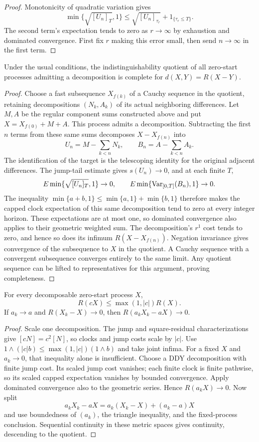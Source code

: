 \begin{proof}
Monotonicity of quadratic variation gives
\[
 \min\{\sqrt{[U_n]_T},1\}
 \leq\sqrt{[U_n]_{\tau_r}}+1_{\{\tau_r\leq T\}}.
\]
The second term's expectation tends to zero as $r\to\infty$ by exhaustion
and dominated convergence. First fix $r$ making this error small, then
send $n\to\infty$ in the first term.
\end{proof}
\begin{theorem}
Under the usual conditions, the indistinguishability quotient of all
zero-start processes admitting a decomposition is complete for
$d(X,Y)=R(X-Y)$.
\end{theorem}
\begin{proof}
Choose a fast subsequence $X_{f(k)}$ of a Cauchy sequence in the quotient,
retaining decompositions $(N_k,A_k)$ of its actual neighboring differences.
Let $M,A$ be the regular component sums constructed above and put
$X=X_{f(0)}+M+A$. This process admits a decomposition.
Subtracting the first $n$ terms from these same sums decomposes
$X-X_{f(n)}$ into
\[
 U_n=M-\sum_{k<n}N_k,\qquad B_n=A-\sum_{k<n}A_k.
\]
The identification of the target is the telescoping identity for the
original adjacent differences. The jump-tail estimate gives $s(U_n)\to0$,
and at each finite $T$,
\[
 E\min\{\sqrt{[U_n]_T},1\}\to0,\qquad
 E\min\{\operatorname{Var}_{[0,T]}(B_n),1\}\to0.
\]
The inequality $\min\{a+b,1\}\leq\min\{a,1\}+\min\{b,1\}$ therefore
makes the capped clock expectation of this same decomposition tend to
zero at every integer horizon. These expectations are at most one, so
dominated convergence also applies to their geometric weighted sum.
The decomposition's $r^1$ cost tends to zero, and hence so does its
infimum $R(X-X_{f(n)})$. Negation invariance gives convergence of the
subsequence to $X$ in the quotient. A Cauchy sequence with a convergent
subsequence converges entirely to the same limit. Any quotient sequence
can be lifted to representatives for this argument, proving completeness.
\end{proof}
\begin{lemma}
For every decomposable zero-start process $X$,
\[R(cX)\leq\max(1,|c|)R(X).\]
If $a_k\to a$ and $R(X_k-X)\to0$, then $R(a_kX_k-aX)\to0$.
\end{lemma}
\begin{proof}
Scale one decomposition. The jump and square-residual characterizations give
$[cN]=c^2[N]$, so clocks and jump costs scale by $|c|$.
Use $1\wedge(|c|b)\leq\max(1,|c|)(1\wedge b)$ and take joint infima.
For a fixed $X$ and $a_k\to0$, that inequality alone is insufficient.
Choose a DDY decomposition with finite jump cost. Its scaled jump cost
vanishes; each finite clock is finite pathwise, so its scaled capped
expectation vanishes by bounded convergence. Apply dominated convergence
also to the geometric series. Hence $R(a_kX)\to0$.
Now split
\[
 a_kX_k-aX=a_k(X_k-X)+(a_k-a)X
\]
 and use boundedness of $(a_k)$,
the triangle inequality, and the fixed-process conclusion. Sequential
continuity in these metric spaces gives continuity, descending to the quotient.
\end{proof}
